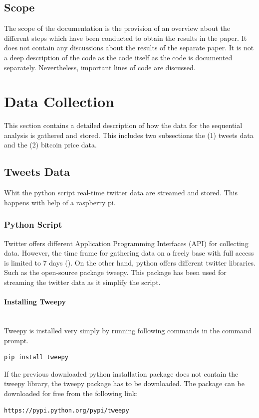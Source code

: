 \documentclass[a4paper,12pt]{article}
\begin{document}
\begin{spacing}{1.2}
\subsection{Scope}
The scope of the documentation is the provision of an overview about the different steps which have been conducted to obtain the results in the paper. It does not contain any discussions about the results of the separate paper. It is not a deep description of the code as the code itself as the code is documented separately. Nevertheless, important lines of code are discussed. 
\clearpage 


\section{Data Collection}
This section contains a detailed description of how the data for the sequential analysis is gathered and stored. This includes two  subsections the (1) tweets data and the (2) bitcoin price data.
\subsection{Tweets Data}
Whit the python script real-time twitter data are streamed and stored. This happens with help of a raspberry pi.
\subsubsection{Python Script}
Twitter offers different Application Programming Interfaces (API) for collecting data. However, the time frame for gathering data on a freely base with full access is limited to 7 days (\cite{twitterinc2017a}). On the other hand, python offers different twitter libraries. Such as the open-source package tweepy. This package has been used for streaming the twitter data as it simplify the script.

\paragraph{Installing Tweepy}\mbox{}\\{}
Tweepy is installed very simply by running following commands in the command prompt. 
\begin{lstlisting}[language=bash]
pip install tweepy
\end{lstlisting}

If the previous downloaded python installation package does not contain the tweepy library, the tweepy package has to be downloaded. The package can be downloaded for free from the following link:
\begin{lstlisting}[language=bash]
https://pypi.python.org/pypi/tweepy
\end{lstlisting}


\end{spacing}
\end{document}
